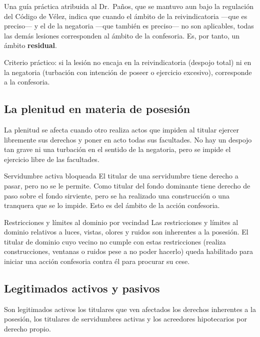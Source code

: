 \documentclass[12pt,oneside]{book}
\begin{document}
Una guía práctica atribuida al Dr.\ Paños, que se mantuvo aun bajo la regulación del Código de Vélez, indica que cuando el ámbito de la reivindicatoria ---que es preciso--- y el de la negatoria ---que también es preciso--- no son aplicables, todas las demás lesiones corresponden al ámbito de la confesoria. Es, por tanto, un ámbito \textbf{residual}.

\begin{important}
Criterio práctico: si la lesión no encaja en la reivindicatoria (despojo total) ni en la negatoria (turbación con intención de poseer o ejercicio excesivo), corresponde a la confesoria.
\end{important}

\subsection{La plenitud en materia de posesión}

La plenitud se afecta cuando otro realiza actos que impiden al titular ejercer libremente sus derechos y poner en acto todas sus facultades. No hay un despojo tan grave ni una turbación en el sentido de la negatoria, pero se impide el ejercicio libre de las facultades.

\begin{example}{Servidumbre activa bloqueada}
El titular de una servidumbre tiene derecho a pasar, pero no se le permite. Como titular del fondo dominante tiene derecho de paso sobre el fondo sirviente, pero se ha realizado una construcción o una tranquera que se lo impide. Esto es del ámbito de la acción confesoria.
\end{example}

\begin{example}{Restricciones y límites al dominio por vecindad}
Las restricciones y límites al dominio relativos a luces, vistas, olores y ruidos son inherentes a la posesión. El titular de dominio cuyo vecino no cumple con estas restricciones (realiza construcciones, ventanas o ruidos pese a no poder hacerlo) queda habilitado para iniciar una acción confesoria contra él para procurar su cese.
\end{example}

\subsection{Legitimados activos y pasivos}

Son legitimados activos los titulares que ven afectados los derechos inherentes a la posesión, los titulares de servidumbres activas y los acreedores hipotecarios por derecho propio.
\end{document}
